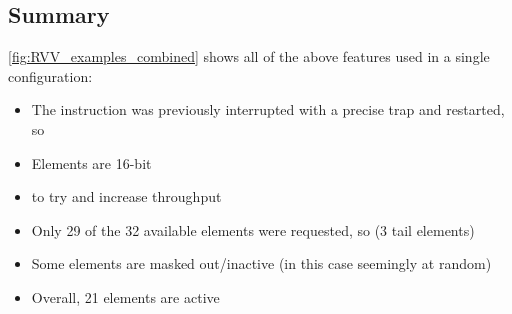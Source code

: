 \subsection{Summary}\label{chap:bg:subsec:rvvsummary}
\cref{fig:RVV_examples_combined} shows all of the above features used in a single configuration:
\begin{itemize}
    \item The instruction was previously interrupted with a precise trap and restarted, so 
    \item Elements are 16-bit
    \item {} to try and increase throughput
    \item Only 29 of the 32 available elements were requested, so  (3 tail elements)
    \item Some elements are masked out/inactive (in this case seemingly at random)
    \item Overall, 21 elements are active
\end{itemize}
